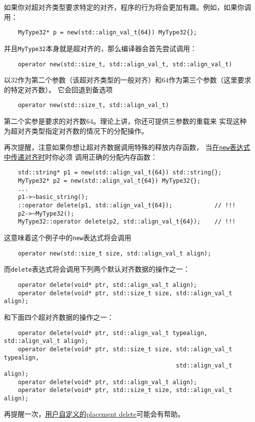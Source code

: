 如果你对超对齐类型要求特定的对齐，程序的行为将会更加有趣。例如，如果你调用：
\begin{lstlisting}
    MyType32* p = new(std::align_val_t{64}) MyType32{};
\end{lstlisting}
并且\texttt{MyType32}本身就是超对齐的，那么编译器会首先尝试调用：
\begin{lstlisting}
    operator new(std::size_t, std::align_val_t, std::align_val_t)
\end{lstlisting}
以32作为第二个参数（该超对齐类型的一般对齐）和64作为第三个参数（这里要求的特定对齐数）。
它会回退到备选项
\begin{lstlisting}
    operator new(std::size_t, std::align_val_t)
\end{lstlisting}
第二个实参是要求的对齐数64。理论上讲，你还可提供三参数的重载来
实现这种为超对齐类型指定对齐数的情况下的分配操作。

再次提醒，注意如果你想让超对齐数据调用特殊的释放内存函数，
当\hyperref[ch30.1.2]{在\texttt{new}表达式中传递对齐时}时你必须
调用正确的分配内存函数：\label{类型特定delete}
\begin{lstlisting}
    std::string* p1 = new(std::align_val_t{64}) std::string{};
    MyType32* p2 = new(std::align_val_t{64}) MyType32{};
    ...
    p1->~basic_string();
    ::operator delete(p1, std::align_val_t{64});            // !!!
    p2->~MyType32();
    MyType32::operator delete(p2, std::align_val_t{64});    // !!!
\end{lstlisting}
这意味着这个例子中的\texttt{new}表达式将会调用
\begin{lstlisting}
    operator new(std::size_t size, std::align_val_t align);
\end{lstlisting}
而\texttt{delete}表达式将会调用下列两个默认对齐数据的操作之一：
\begin{lstlisting}
    operator delete(void* ptr, std::align_val_t align);
    operator delete(void* ptr, std::size_t size, std::align_val_t align);
\end{lstlisting}
和下面四个超对齐数据的操作之一：
\begin{lstlisting}
    operator delete(void* ptr, std::align_val_t typealign, std::align_val_t align);
    operator delete(void* ptr, std::size_t size, std::align_val_t typealign,
                                                 std::align_val_t align);
    operator delete(void* ptr, std::align_val_t align);
    operator delete(void* ptr, std::size_t size, std::align_val_t align);
\end{lstlisting}
再提醒一次，\hyperref[ch30.1.2.2]{用户自定义的placement delete}可能会有帮助。



